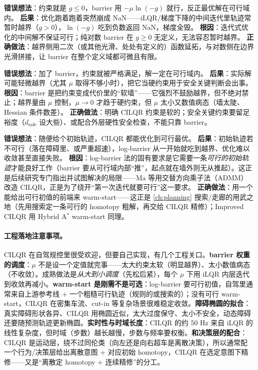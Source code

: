 \begin{pitfall}
\textbf{错误想法}：约束就是 $g\le 0$，barrier 用 $-\mu\ln(-g)$ 就行，反正最优解在可行域内。\;
\textbf{后果}：优化跑着跑着突然崩成 NaN——iLQR/梯度下降的中间迭代里轨迹常暂时越界（$g>0$），$\ln(-g)$ 吃到负数返回 NaN，梯度全毁。\;
\textbf{根因}：迭代式优化的中间解不保证可行；纯对数 barrier 在 $g\ge 0$ 无定义，无法容忍暂时越界。\;
\textbf{正确做法}：越界侧用二次（或其他光滑、处处有定义的）函数延拓，与对数侧在边界光滑拼接，让 barrier 在整个定义域都可微且有限。
\end{pitfall}

\begin{pitfall}
\textbf{错误想法}：加了 barrier，约束就被严格满足，解一定在可行域内。\;
\textbf{后果}：实际解可能轻微越界（尤其 $\mu$ 取得不够小时），把它当硬约束用于安全关键判断会出事。\;
\textbf{根因}：barrier 是把约束变成代价里的“软墙”——它强烈不鼓励越界，但不绝对禁止；越界量由 $\mu$ 控制，$\mu\to 0$ 才趋于硬约束，但 $\mu$ 太小又数值病态（墙太陡、Hessian 条件数差）。\;
\textbf{正确做法}：明确 CILQR 约束是软的；安全关键约束要留足裕度（$d_{\text{safe}}$ 设大些）、或配合外层硬性安全检查，不能只靠 barrier。
\end{pitfall}

\begin{pitfall}
\textbf{错误想法}：随便给个初始轨迹，CILQR 都能优化到可行最优。\;
\textbf{后果}：初始轨迹若不可行（落在障碍里、或严重超速），log-barrier 从一开始就吃到越界、优化难以收敛甚至直接失败。\;
\textbf{根因}：log-barrier 法的固有要求是它需要一条\emph{可行的初始轨迹}才能良好工作（barrier 要从可行域内部“推”，起点就在墙外则无从推起）。这正是后续研究专门指出并试图解决的局限——Ma 等\cite{ma2022admmilqr}用交替方向乘子法（ADMM）改造 CILQR，正是为了绕开“第一次迭代就要可行”这一要求。\;
\textbf{正确做法}：用一个能给出可行初值的前端来 warm-start——这正是 \cref{ch:planning} 搜索/走廊的用武之地（先用搜索定一条可行的 homotopy 粗解，再交给 CILQR 精修）；Improved CILQR 用 Hybrid A$^*$ warm-start 同理。
\end{pitfall}

\paragraph{工程落地注意事项。}
CILQR 在自驾规控里很受欢迎，但要自己实现，有几个工程关口。\textbf{barrier 权重的调度}：$\mu$ 不是设一个定值就完事——太大约束太软（明显越界）、太小数值病态（不收敛）。成熟做法是\emph{从大到小调度}（先松后紧），每个 $\mu$ 下用 iLQR 内层迭代到收敛再减小。\textbf{warm-start 是刚需不是可选}：log-barrier 要可行初值，自驾里通常来自上游参考线 + 一个粗糙可行轨迹（规则的或搜索的）；没有可行 warm-start，CILQR 在密集车流、cut-in 等复杂场景很难稳定收敛。\textbf{障碍椭圆的拟合}：真实障碍形状各异、CILQR 用椭圆近似，太大过度保守、太小不安全，动态障碍还要随预测轨迹更新椭圆。\textbf{实时性与时域长度}：CILQR 的约 $50$ Hz 来自 iLQR 的线性复杂度，但时域（步数）越长越慢，步数与频率要权衡。\textbf{和决策层的配合}：CILQR 是运动层，绕不过同伦类（向左还是向右超车是离散决策），所以通常配一个行为/决策层给出离散意图 + 对应初始 homotopy，CILQR 在选定意图下精修——又是“离散定 homotopy + 连续精修”的分工。

